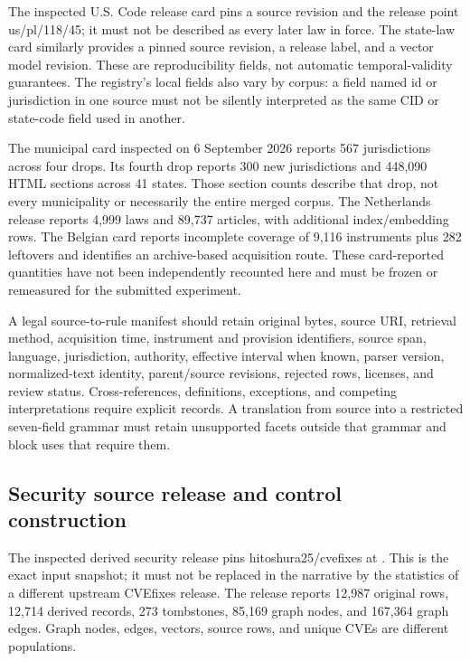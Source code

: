 \documentclass{article}
\begin{document}
The inspected U.S. Code release card pins a source revision and the release point us/pl/118/45; it must not be described as every later law in force. The state-law card similarly provides a pinned source revision, a release label, and a vector model revision. These are reproducibility fields, not automatic temporal-validity guarantees. The registry's local fields also vary by corpus: a field named id or jurisdiction in one source must not be silently interpreted as the same CID or state-code field used in another.

The municipal card inspected on 6 September 2026 reports 567 jurisdictions across four drops. Its fourth drop reports 300 new jurisdictions and 448,090 HTML sections across 41 states. Those section counts describe that drop, not every municipality or necessarily the entire merged corpus. The Netherlands release reports 4,999 laws and 89,737 articles, with additional index/embedding rows. The Belgian card reports incomplete coverage of 9,116 instruments plus 282 leftovers and identifies an archive-based acquisition route. These card-reported quantities have not been independently recounted here and must be frozen or remeasured for the submitted experiment.

A legal source-to-rule manifest should retain original bytes, source URI, retrieval method, acquisition time, instrument and provision identifiers, source span, language, jurisdiction, authority, effective interval when known, parser version, normalized-text identity, parent/source revisions, rejected rows, licenses, and review status. Cross-references, definitions, exceptions, and competing interpretations require explicit records. A translation from source into a restricted seven-field grammar must retain unsupported facets outside that grammar and block uses that require them.

\subsection{Security source release and control construction}

The inspected derived security release pins hitoshura25/cvefixes at . This is the exact input snapshot; it must not be replaced in the narrative by the statistics of a different upstream CVEfixes release. The release reports 12,987 original rows, 12,714 derived records, 273 tombstones, 85,169 graph nodes, and 167,364 graph edges. Graph nodes, edges, vectors, source rows, and unique CVEs are different populations.
\end{document}
